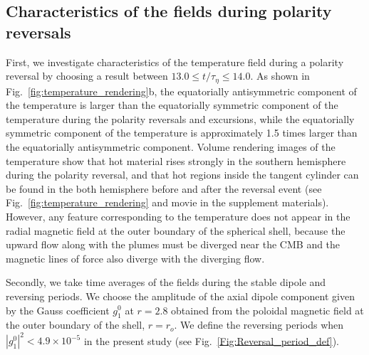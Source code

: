 \subsection{Characteristics of the fields during polarity reversals}

First, we investigate characteristics of the temperature field during a polarity reversal by choosing a result between $13.0 \le t/\tau_{\eta} \le 14.0$. 
As shown in Fig.~\ref{fig:temperature_rendering}b, the equatorially antisymmetric component of the temperature is larger than the equatorially symmetric component of the temperature during the polarity reversals and excursions, while the equatorially symmetric component of the temperature is approximately 1.5 times larger than the equatorially antisymmetric component. 
{\color{red}
Volume rendering images of the temperature show that hot material rises strongly in the southern hemisphere during the polarity reversal, and that hot regions inside the tangent cylinder can be found in the both hemisphere before and after the reversal event
(see Fig.~\ref{fig:temperature_rendering} and movie in the supplement materials). 
}
However, any feature corresponding to the temperature does not appear in the radial magnetic field at the outer boundary of the spherical shell, 
{\color{green}
because the upward flow along with the plumes must be diverged near the CMB and the magnetic lines of force also diverge with the diverging flow.
}

Secondly, we take time averages of the fields during the stable dipole and reversing periods. 
We choose the amplitude of the axial dipole component given by the Gauss coefficient $g_{1}^{0}$ at $r = 2.8$ obtained from the poloidal magnetic field at the outer boundary of the shell, $r = r_{o}$. 
We define the reversing periods when $\left| g_{1}^{0} \right|^2 < 4.9 \times 10^{-5}$ in the present study (see Fig.~\ref{Fig:Reversal_period_def}). 





